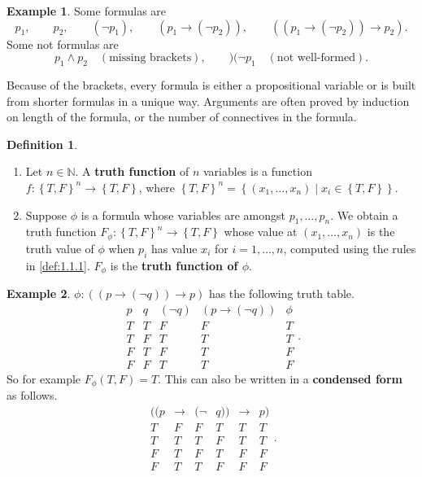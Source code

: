 \documentclass{article}
\newcommand{\N}{\mathbb{N}}
\newcommand{\rb}[1]{\left( #1 \right)}
\newcommand{\cb}[1]{\left\{ #1 \right\}}
\newcommand{\notb}[1]{\rb{\neg #1}}
\newcommand{\impb}[2]{\rb{#1 \rightarrow #2}}
\theoremstyle{definition}\newtheorem{definition}{Definition}[subsection]
\theoremstyle{definition}\newtheorem{remark}[definition]{Remark}
\theoremstyle{definition}\newtheorem*{example}{Example}
\theoremstyle{definition}\newtheorem*{note}{Note}
\begin{document}
\begin{example}
Some formulas are
$$ p_1, \qquad p_2, \qquad \notb{p_1}, \qquad \impb{p_1}{\notb{p_2}}, \qquad \impb{\impb{p_1}{\notb{p_2}}}{p_2}. $$
Some not formulas are
$$ p_1 \land p_2 \quad \rb{\text{missing brackets}}, \qquad )( \neg p_1 \quad \rb{\text{not well-formed}}. $$
\end{example}

Because of the brackets, every formula is either a propositional variable or is built from shorter formulas in a unique way. Arguments are often proved by induction on length of the formula, or the number of connectives in the formula.

\begin{definition}
\hfill
\begin{enumerate}
\item Let $ n \in \N $. A \textbf{truth function} of $ n $ variables is a function $ f : \cb{T, F}^n \to \cb{T, F} $, where $ \cb{T, F}^n = \cb{\rb{x_1, \dots, x_n} \mid x_i \in \cb{T, F}} $.
\item Suppose $ \phi $ is a formula whose variables are amongst $ p_1, \dots, p_n $. We obtain a truth function $ F_\phi : \cb{T, F}^n \to \cb{T, F} $ whose value at $ \rb{x_1, \dots, x_n} $ is the truth value of $ \phi $ when $ p_i $ has value $ x_i $ for $ i = 1, \dots, n $, computed using the rules in \ref{def:1.1.1}. $ F_\phi $ is the \textbf{truth function of $ \phi$}.
\end{enumerate}
\end{definition}

\begin{example}
$ \phi : \impb{\impb{p}{\notb{q}}}{p} $ has the following truth table.
$$
\begin{array}{cc|ccc}
p & q & \notb{q} & \impb{p}{\notb{q}} & \phi \\
\hline
T & T & F & F & T \\
T & F & T & T & T \\
F & T & F & T & F \\
F & F & T & T & F
\end{array}.
$$
So for example $ F_\phi\rb{T, F} = T $. This can also be written in a \textbf{condensed form} as follows.
$$
\begin{array}{rcrlcl}
((p & \rightarrow & (\neg & q)) & \rightarrow & p) \\
\hline
T & F & F & T & T & T \\
T & T & T & F & T & T \\
F & T & F & T & F & F \\
F & T & T & F & F & F
\end{array}.
$$
\end{example}
\end{document}
